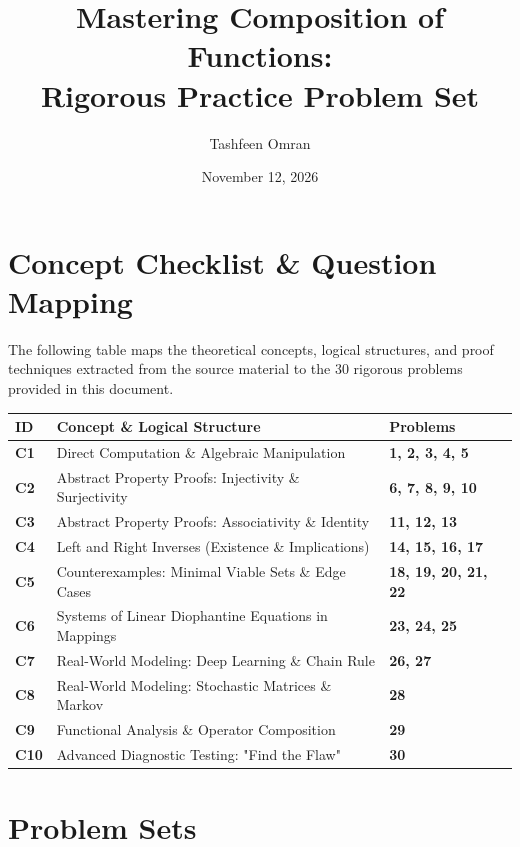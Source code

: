 \documentclass[11pt, letterpaper]{article}
\theoremstyle{definition}
\theoremstyle{remark}
\begin{document}
\title{Mastering Composition of Functions: \\ Rigorous Practice Problem Set}
\author{Tashfeen Omran}
\date{November 12, 2026}
\maketitle

\tableofcontents
\newpage

\section{Concept Checklist \& Question Mapping}

The following table maps the theoretical concepts, logical structures, and proof techniques extracted from the source material to the 30 rigorous problems provided in this document.

\renewcommand{\arraystretch}{1.5}
\begin{tabularx}{\textwidth}{>{\bfseries}l X >{\bfseries}l}
\toprule
ID & Concept \& Logical Structure & Problems \\
\midrule
C1 & Direct Computation \& Algebraic Manipulation & 1, 2, 3, 4, 5 \\
C2 & Abstract Property Proofs: Injectivity \& Surjectivity & 6, 7, 8, 9, 10 \\
C3 & Abstract Property Proofs: Associativity \& Identity & 11, 12, 13 \\
C4 & Left and Right Inverses (Existence \& Implications) & 14, 15, 16, 17 \\
C5 & Counterexamples: Minimal Viable Sets \& Edge Cases & 18, 19, 20, 21, 22 \\
C6 & Systems of Linear Diophantine Equations in Mappings & 23, 24, 25 \\
C7 & Real-World Modeling: Deep Learning \& Chain Rule & 26, 27 \\
C8 & Real-World Modeling: Stochastic Matrices \& Markov & 28 \\
C9 & Functional Analysis \& Operator Composition & 29 \\
C10 & Advanced Diagnostic Testing: "Find the Flaw" & 30 \\
\bottomrule
\end{tabularx}

\newpage

\section{Problem Sets}
\end{document}
